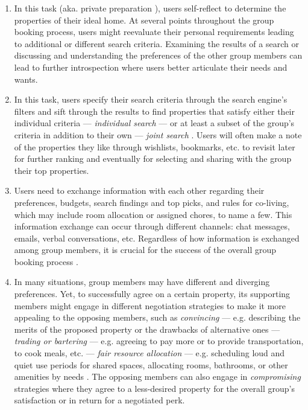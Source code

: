 \begin{enumerate}[label={}, leftmargin=0cm, itemindent=0.2cm]

\item \tIntrospection In this task (aka. private preparation \cite{pocketnegotiator}), users self-reflect to determine the properties of their ideal home. At several points throughout the group booking process, users might reevaluate their personal requirements leading to additional or different search criteria. Examining  the results of a search or discussing and understanding the preferences of the other group members can lead to further introspection where users better articulate their needs and wants. 

\item \tSearch  In this task, users specify their search criteria through the search engine's filters and sift through the results to find properties that satisfy either their individual criteria --- \textit{individual search} --- or at least a subset of the group's criteria in addition to their own --- \textit{joint search} \cite{resultsspace}. Users will often make a note of the properties they like through wishlists, bookmarks, etc. to revisit later for further ranking and eventually for selecting and sharing with the group their top properties.

\item \tInformationExchange  Users need to exchange information with each other regarding their preferences, budgets, search findings and top picks, and rules for co-living, which may include room allocation or assigned chores, to name a few. This information exchange can occur through different channels: chat messages, emails, verbal conversations, etc. Regardless of how information is exchanged among group members, it is crucial for the success of the overall group booking process \cite{meetingmediator}.
 
\item \tNegotiation  In many situations, group members may have different and diverging preferences. Yet, to successfully agree on a certain property, its supporting members might engage in different negotiation strategies to make it more appealing to the opposing members, such as  \textit{convincing} --- e.g. describing the merits of the proposed property or the drawbacks of alternative ones \cite{meetingmediator} --- 
    \textit{trading or bartering} --- e.g. agreeing to pay more or to provide transportation, to cook meals, etc. \cite{pocketnegotiator} --- 
    \textit{fair resource allocation} --- e.g. scheduling loud and quiet use periods for shared spaces, allocating rooms, bathrooms, or other amenities by needs \cite{fairresourceallocation}. 
    The opposing members can also engage in \textit{compromising} strategies where they agree to a less-desired property for the overall group's satisfaction or in return for a negotiated perk.


\end{enumerate}
